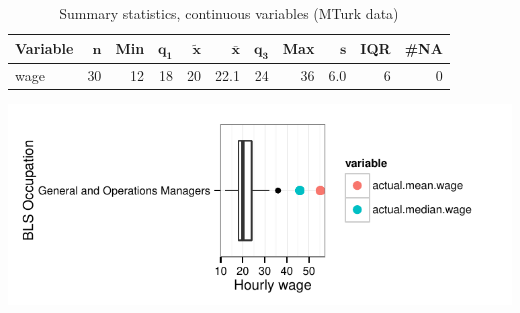 \documentclass[a4paper,10pt]{article}\usepackage[]{graphicx}\usepackage[]{color}
\makeatletter
\def\maxwidth{ %
  \ifdim\Gin@nat@width>\linewidth
    \linewidth
  \else
    \Gin@nat@width
  \fi
}
\makeatother
\begin{document}
\begin{table}[ht]
\centering
{\footnotesize
\begin{tabular}{lrrrrrrrrrr}
 \textbf{Variable} & $\mathbf{n}$ & \textbf{Min} & $\mathbf{q_1}$ & $\mathbf{\widetilde{x}}$ & $\mathbf{\bar{x}}$ & $\mathbf{q_3}$ & \textbf{Max} & $\mathbf{s}$ & \textbf{IQR} & \textbf{\#NA} \\ 
  \hline
wage & 30 & 12 & 18 & 20 & 22.1 & 24 & 36 & 6.0 & 6 & 0 \\ 
  \end{tabular}
}
\caption{Summary statistics, continuous variables (MTurk data)} 
\label{tab2:11-1020}
\end{table}


{\centering \includegraphics[width=\maxwidth]{figure/unnamed-chunk-215} 

}
\end{document}
